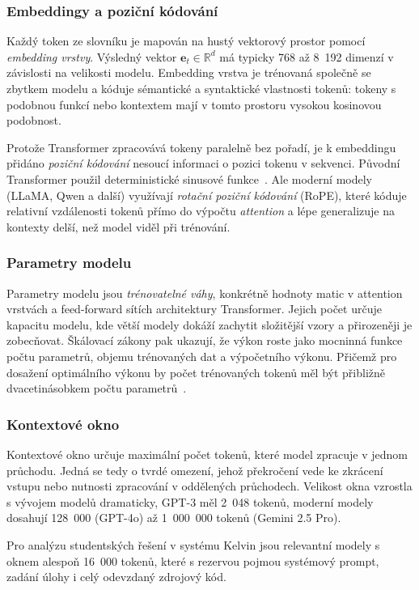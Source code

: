 \subsubsection*{Embeddingy a poziční kódování}
\label{subsubsec:embedding-positional-encoding}

Každý token ze slovníku je mapován na hustý vektorový prostor pomocí \textit{embedding vrstvy}.
Výsledný vektor $\mathbf{e}_t \in \mathbb{R}^d$ má typicky 768 až 8~192 dimenzí v závislosti na velikosti modelu.
Embedding vrstva je trénovaná společně se zbytkem modelu a kóduje sémantické a syntaktické vlastnosti tokenů: tokeny s podobnou funkcí nebo kontextem mají v tomto prostoru vysokou kosinovou podobnost.

Protože Transformer zpracovává tokeny paralelně bez pořadí, je k embeddingu přidáno \textit{poziční kódování} nesoucí informaci o pozici tokenu v sekvenci.
Původní Transformer použil deterministické sinusové funkce~\cite{vaswani-attention}.
Ale moderní modely (LLaMA, Qwen a další) využívají \textit{rotační poziční kódování} (RoPE), které kóduje relativní vzdálenosti tokenů přímo do výpočtu \textit{attention} a lépe generalizuje na kontexty delší, než model viděl při trénování.

\subsubsection*{Parametry modelu}
\label{subsubsec:model-parameters}

Parametry modelu jsou \textit{trénovatelné váhy}, konkrétně hodnoty matic v attention vrstvách a feed-forward sítích architektury Transformer.
Jejich počet určuje kapacitu modelu, kde větší modely dokáží zachytit složitější vzory a přirozeněji je zobecňovat.
Škálovací zákony pak ukazují, že výkon roste jako mocninná funkce počtu parametrů, objemu trénovaných dat a výpočetního výkonu.
Přičemž pro dosažení optimálního výkonu by počet trénovaných tokenů měl být přibližně dvacetinásobkem počtu parametrů~\cite{hoffmann-chinchilla}.

\subsubsection*{Kontextové okno}
\label{subsubsec:context-window}

Kontextové okno určuje maximální počet tokenů, které model zpracuje v jednom průchodu.
Jedná se tedy o tvrdé omezení, jehož překročení vede ke zkrácení vstupu nebo nutnosti zpracování v oddělených průchodech.
Velikost okna vzrostla s vývojem modelů dramaticky, GPT-3 měl 2~048 tokenů, moderní modely dosahují 128~000 (GPT-4o) až 1~000~000 tokenů (Gemini 2.5 Pro).

Pro analýzu studentských řešení v systému Kelvin jsou relevantní modely s oknem alespoň 16~000 tokenů, které s rezervou pojmou systémový prompt, zadání úlohy i celý odevzdaný zdrojový kód.

\endinput